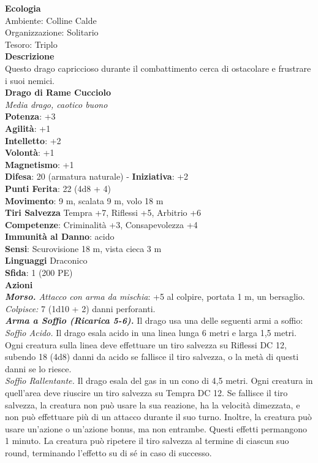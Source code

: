 \begin{multicols}{2}
\textbf{Ecologia}\\
Ambiente: Colline Calde\\
Organizzazione: Solitario\\
Tesoro: Triplo\\
\textbf{Descrizione}\\
Questo drago capriccioso durante il combattimento cerca di ostacolare e frustrare i suoi nemici.\\


\medskip\textbf{Drago di Rame Cucciolo}\\
\emph{Media drago, caotico buono}\\
\textbf{Potenza}: +3\\
\textbf{Agilità}: +1\\
\textbf{Intelletto}: +2\\
\textbf{Volontà}: +1\\
\textbf{Magnetismo}: +1\\
\textbf{Difesa}: 20 (armatura naturale) - \textbf{Iniziativa}: +2\\
\textbf{Punti Ferita}: 22 (4d8 + 4)\\
\textbf{Movimento}: 9 m, scalata 9 m, volo 18 m\\
\textbf{Tiri Salvezza} Tempra +7, Riflessi +5, Arbitrio +6\\
\textbf{Competenze}: Criminalità +3, Consapevolezza +4\\
\textbf{Immunità al Danno}: acido\\
\textbf{Sensi}: Scurovisione 18 m, vista cieca 3 m\\
\textbf{Linguaggi} Draconico\\
\textbf{Sfida}: 1 (200 PE)\smallskip\\
\smallskip\textbf{Azioni}\\
\emph{\textbf{Morso.} Attacco con arma da mischia}: +5 al colpire, portata 1 m, un bersaglio.\\
\emph{Colpisce:} 7 (1d10 + 2) danni perforanti.\\
\emph{\textbf{Arma a Soffio (Ricarica 5-6).}} Il drago usa una delle seguenti armi a soffio:\\
\emph{Soffio Acido.} Il drago esala acido in una linea lunga 6 metri e larga 1,5 metri. Ogni creatura sulla linea deve effettuare un tiro salvezza su Riflessi DC  12, subendo 18 (4d8) danni da acido se fallisce il tiro salvezza, o la metà di questi danni se lo riesce.\\
\emph{Soffio Rallentante.} Il drago esala del gas in un cono di 4,5 metri. Ogni creatura in quell'area deve riuscire un tiro salvezza su Tempra DC  12. Se fallisce il tiro salvezza, la creatura non può usare la sua reazione, ha la velocità dimezzata, e non può effettuare più di un attacco durante il suo turno. Inoltre, la creatura può usare un'azione o un'azione bonus, ma non entrambe. Questi effetti permangono 1 minuto. La creatura può ripetere il tiro salvezza al termine di ciascun suo round, terminando l'effetto su di sé in caso di successo.\\

\end{multicols}
